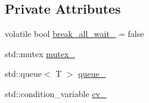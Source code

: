 \subsection*{Private Attributes}
\begin{DoxyCompactItemize}
\item 
volatile bool \hyperlink{classapollo_1_1cyber_1_1base_1_1ThreadSafeQueue_a30e80687183f6d6eab2ec9cb77637666}{break\-\_\-all\-\_\-wait\-\_\-} = false
\item 
std\-::mutex \hyperlink{classapollo_1_1cyber_1_1base_1_1ThreadSafeQueue_ada372a404c6d74035a9c603cfe2a004f}{mutex\-\_\-}
\item 
std\-::queue$<$ T $>$ \hyperlink{classapollo_1_1cyber_1_1base_1_1ThreadSafeQueue_a8e0f3ac13d5adcdc05c4973594fbee27}{queue\-\_\-}
\item 
std\-::condition\-\_\-variable \hyperlink{classapollo_1_1cyber_1_1base_1_1ThreadSafeQueue_ad75c7d1bbe77c6c19112dee2208e16df}{cv\-\_\-}
\end{DoxyCompactItemize}


